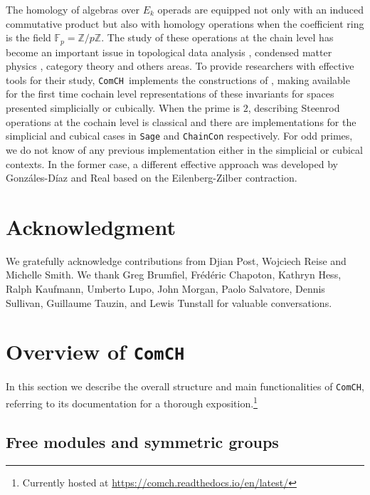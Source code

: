 \documentclass{amsart}
\newcommand{\comch}{\texttt{ComCH}}
\begin{document}
The homology of algebras over $E_k$ operads are equipped not only with an induced commutative product but also with homology operations when the coefficient ring is the field $\mathbb F_p = \mathbb Z/ p\mathbb Z$.
The study of these operations at the chain level has become an important issue in topological data analysis \cite{medina2018persistence}, condensed matter physics \cite{Kapustin2017}, category theory \cite{medina2020globular} and others areas.
To provide researchers with effective tools for their study, \comch\, implements the constructions of \cite{medina2021maysteenrod}, making available for the first time cochain level representations of these invariants for spaces presented simplicially or cubically.
When the prime is $2$, describing Steenrod operations at the cochain level is classical and there are implementations for the simplicial \cite{GonReal1999} and cubical \cite{Pilarczyk2016} cases in \texttt{Sage} \cite{sage} and \texttt{ChainCon} \cite{chaincon} respectively.
For odd primes, we do not know of any previous implementation either in the simplicial or cubical contexts.
In the former case, a different effective approach was developed by Gonz\'ales-D\'iaz and Real \cite{GonReal2003, GonReal2005} based on the Eilenberg-Zilber contraction.

\section*{Acknowledgment}
We gratefully acknowledge contributions from Djian Post, Wojciech Reise and Michelle Smith.
We thank Greg Brumfiel, Fr\'{e}d\'{e}ric Chapoton, Kathryn Hess, Ralph Kaufmann, Umberto Lupo, John Morgan, Paolo Salvatore, Dennis Sullivan, Guillaume Tauzin, and Lewis Tunstall for valuable conversations.


\section{Overview of \comch} \label{s: overview}
In this section we describe the overall structure and main functionalities of \comch, referring to its documentation for a thorough exposition.\footnote{Currently hosted at \url{https://comch.readthedocs.io/en/latest/}}

\subsection{Free modules and symmetric groups}
\end{document}
